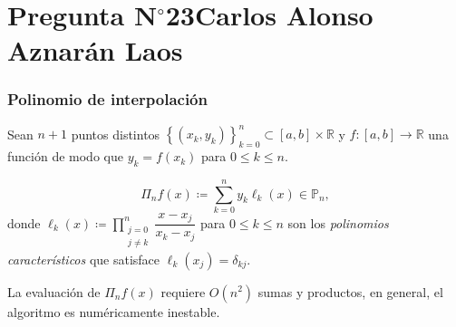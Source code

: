 \section{Pregunta N$^{\circ}$23\qquad Carlos Alonso Aznarán Laos}

\begin{frame}
	\frametitle{Polinomio de interpolación}

	Sean $n+1$ puntos distintos
	\begin{math}
		{
			\left\{
			\left(x_{k},y_{k}\right)
			\right\}
		}_{k=0}^{n}\subset
		\left[a,b\right]\times\mathbb{R}
	\end{math}
	y
	\begin{math}
		f\colon\left[a,b\right]\to
		\mathbb{R}
	\end{math}
	una función de modo que
	\begin{math}
		y_{k}=
		f\left(x_{k}\right)
	\end{math}
	para $0\leq k\leq n$.

	\begin{definition}
		\begin{equation*}
			\Pi_{n}
			f\left(x\right)\coloneqq
			\sum\limits_{k=0}^{n}
			y_{k}
			\ell_{k}\left(x\right)\in\mathbb{P}_{n},
		\end{equation*}
		donde
		\begin{math}
			\ell_{k}
			\left(x\right)\coloneq
			\prod\limits_{\substack{j=0\\j\neq k}}^{n}
			\dfrac{x-x_{j}}{x_{k}-x_{j}}
		\end{math}
		para $0\leq k\leq n$ son los \emph{polinomios característicos}
		que satisface
		\begin{math}
			\ell_{k}
			\left(x_{j}\right)=
			\delta_{kj}
		\end{math}.

		La evaluación de $\Pi_{n}f\left(x\right)$ requiere
		$O\left(n^{2}\right)$ sumas y productos, en general, el algoritmo
		es numéricamente inestable.
	\end{definition}



\end{frame}

